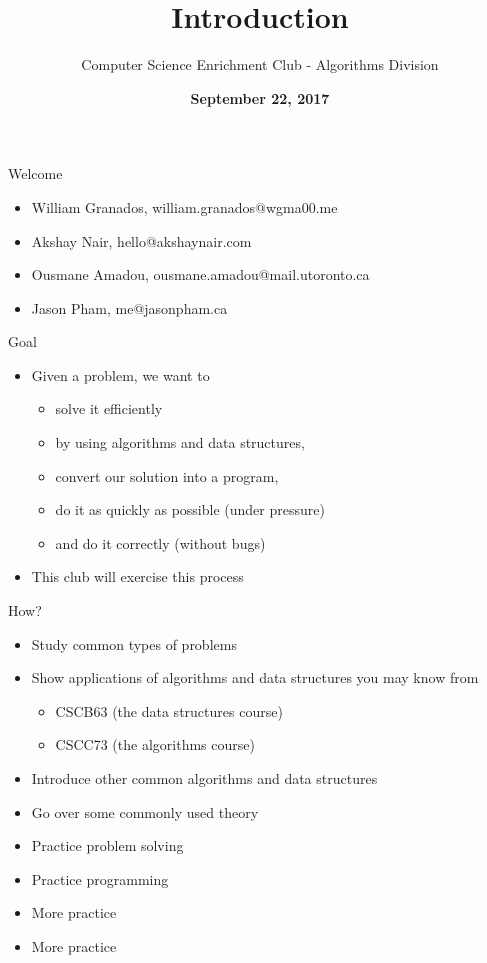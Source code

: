\documentclass[10pt]{beamer}
\title{Introduction}
\author{Computer Science Enrichment Club - Algorithms Division}
\date{\textbf{September 22, 2017}}
\newcommand{\bi}{\begin{itemize}}
\newcommand{\ei}{\end{itemize}}
\begin{document}
\maketitle

\begin{frame}{Welcome}
    \bi
        \item William Granados, {\alert{william.granados@wgma00.me}}
        \item Akshay Nair, {\alert{hello@akshaynair.com}}
        \item Ousmane Amadou, {\alert{ousmane.amadou@mail.utoronto.ca}}
        \item Jason Pham, {\alert{me@jasonpham.ca}}
    \ei
\end{frame}

\begin{frame}{Goal}
    \bi
        \item Given a problem, we want to
            \bi
                \item solve it efficiently
                \item by using algorithms and data structures,
                \item convert our solution into a program,
                \item do it as quickly as possible (under pressure)
                \item and do it correctly (without bugs)
            \ei
        \vspace{20pt}

    \item This club will exercise this process
    \ei
\end{frame}

\begin{frame}{How?}
    \bi
        \item Study common types of problems
        \item Show applications of algorithms and data structures you may know from
	        \bi
		        \item CSCB63 (the data structures course)
		        \item CSCC73 (the algorithms course)
	        \ei
        \item Introduce other common algorithms and data structures
        \item Go over some commonly used theory
        \item Practice problem solving
        \item Practice programming
        \item More practice
        \item More practice
    \ei
\end{frame}
\end{document}
